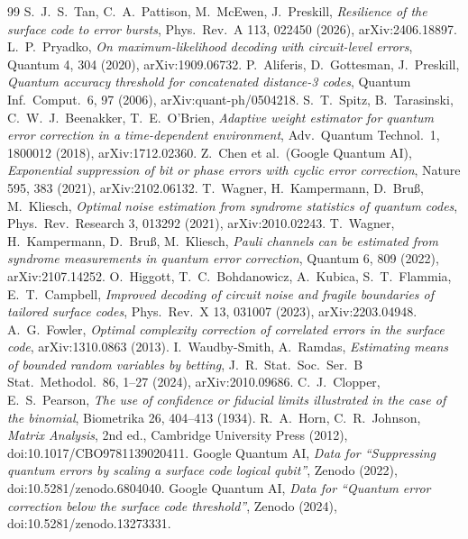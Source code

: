 \documentclass[11pt]{article}
\theoremstyle{plain}
\theoremstyle{definition}
\theoremstyle{remark}
\renewcommand{\_}{\oldunderscore\allowbreak}
\begin{document}
\begin{thebibliography}{99}
 S.~J.~S.~Tan, C.~A.~Pattison, M.~McEwen, J.~Preskill, \emph{Resilience of the surface code to error bursts}, Phys.\ Rev.\ A 113, 022450 (2026), arXiv:2406.18897.
 L.~P.~Pryadko, \emph{On maximum-likelihood decoding with circuit-level errors}, Quantum 4, 304 (2020), arXiv:1909.06732.
 P.~Aliferis, D.~Gottesman, J.~Preskill, \emph{Quantum accuracy threshold for concatenated distance-3 codes}, Quantum Inf.\ Comput.\ 6, 97 (2006), arXiv:quant-ph/0504218.
 S.~T.~Spitz, B.~Tarasinski, C.~W.~J.~Beenakker, T.~E.~O'Brien, \emph{Adaptive weight estimator for quantum error correction in a time-dependent environment}, Adv.\ Quantum Technol.\ 1, 1800012 (2018), arXiv:1712.02360.
 Z.~Chen et al.\ (Google Quantum AI), \emph{Exponential suppression of bit or phase errors with cyclic error correction}, Nature 595, 383 (2021), arXiv:2102.06132.
 T.~Wagner, H.~Kampermann, D.~Bru{\ss}, M.~Kliesch, \emph{Optimal noise estimation from syndrome statistics of quantum codes}, Phys.\ Rev.\ Research 3, 013292 (2021), arXiv:2010.02243.
 T.~Wagner, H.~Kampermann, D.~Bru{\ss}, M.~Kliesch, \emph{Pauli channels can be estimated from syndrome measurements in quantum error correction}, Quantum 6, 809 (2022), arXiv:2107.14252.
 O.~Higgott, T.~C.~Bohdanowicz, A.~Kubica, S.~T.~Flammia, E.~T.~Campbell, \emph{Improved decoding of circuit noise and fragile boundaries of tailored surface codes}, Phys.\ Rev.\ X 13, 031007 (2023), arXiv:2203.04948.
 A.~G.~Fowler, \emph{Optimal complexity correction of correlated errors in the surface code}, arXiv:1310.0863 (2013).
 I.~Waudby-Smith, A.~Ramdas, \emph{Estimating means of bounded random variables by betting}, J.\ R.\ Stat.\ Soc.\ Ser.\ B Stat.\ Methodol.\ 86, 1--27 (2024), arXiv:2010.09686.
 C.~J.~Clopper, E.~S.~Pearson, \emph{The use of confidence or fiducial limits illustrated in the case of the binomial}, Biometrika 26, 404--413 (1934).
 R.~A.~Horn, C.~R.~Johnson, \emph{Matrix Analysis}, 2nd ed., Cambridge University Press (2012), doi:10.1017/CBO9781139020411.
 Google Quantum AI, \emph{Data for ``Suppressing quantum errors by scaling a surface code logical qubit''}, Zenodo (2022), doi:10.5281/zenodo.6804040.
 Google Quantum AI, \emph{Data for ``Quantum error correction below the surface code threshold''}, Zenodo (2024), doi:10.5281/zenodo.13273331.
\end{thebibliography}
\end{document}

